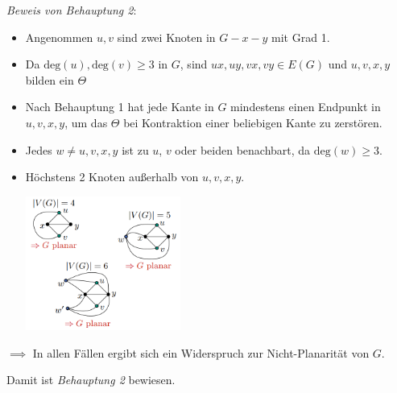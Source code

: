 \textit{Beweis von Behauptung 2}: 
\begin{itemize}
	\item Angenommen $u,v$ sind zwei Knoten in $G-x-y$ mit Grad 1.
	\item Da $\text{deg}(u),\text{deg}(v)\geq 3$ in $G$, sind $ux, uy, vx, vy \in E(G)$ und $u,v,x,y$ bilden ein $\Theta$
	\item Nach Behauptung 1 hat jede Kante in $G$ mindestens einen Endpunkt in $u, v, x, y$, um das $\Theta$ bei Kontraktion einer beliebigen Kante zu zerstören.
	\item Jedes $w\neq u, v, x, y$ ist zu $u$, $v$ oder beiden benachbart, da $\text{deg}(w)\geq 3$.
	\item Höchstens 2 Knoten außerhalb von $u, v, x, y$.
	\begin{center}
		\includegraphics[width=0.4\textwidth]{images/wagner-8.png}
	\end{center}
\end{itemize}

$\implies$ In allen Fällen ergibt sich ein Widerspruch zur Nicht-Planarität von $G$.

Damit ist \textit{Behauptung 2} bewiesen.\\

